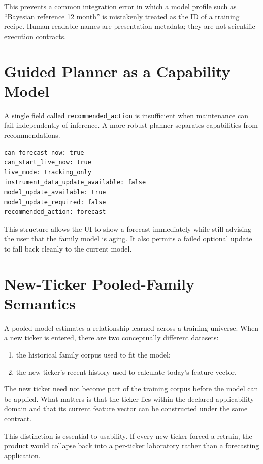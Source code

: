 \documentclass[11pt]{article}
\begin{document}
This prevents a common integration error in which a model profile such as ``Bayesian reference 12 month'' is mistakenly treated as the ID of a training recipe. Human-readable names are presentation metadata; they are not scientific execution contracts.

\section{Guided Planner as a Capability Model}
A single field called \texttt{recommended\_action} is insufficient when maintenance can fail independently of inference. A more robust planner separates capabilities from recommendations.
\begin{verbatim}
can_forecast_now: true
can_start_live_now: true
live_mode: tracking_only
instrument_data_update_available: false
model_update_available: true
model_update_required: false
recommended_action: forecast
\end{verbatim}
This structure allows the UI to show a forecast immediately while still advising the user that the family model is aging. It also permits a failed optional update to fall back cleanly to the current model.

\section{New-Ticker Pooled-Family Semantics}
A pooled model estimates a relationship learned across a training universe. When a new ticker is entered, there are two conceptually different datasets:
\begin{enumerate}[itemsep=0.2em]
\item the historical family corpus used to fit the model;
\item the new ticker's recent history used to calculate today's feature vector.
\end{enumerate}
The new ticker need not become part of the training corpus before the model can be applied. What matters is that the ticker lies within the declared applicability domain and that its current feature vector can be constructed under the same contract.

This distinction is essential to usability. If every new ticker forced a retrain, the product would collapse back into a per-ticker laboratory rather than a forecasting application.
\end{document}
